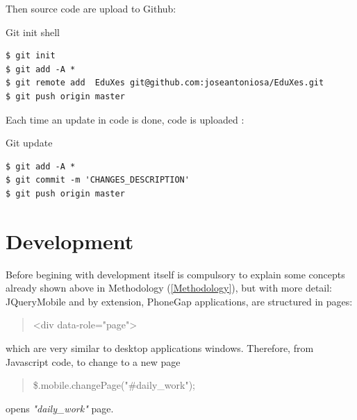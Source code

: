 Then source code are upload to Github: 

  \begin{bclogo}[couleur=green!30,arrondi=0.1, logo=\bcpanchant,  ombre=true ] 
{Git init shell}   
\begin{verbatim}
$ git init
$ git add -A *
$ git remote add  EduXes git@github.com:joseantoniosa/EduXes.git 
$ git push origin master
\end{verbatim}
\end{bclogo}

Each time an update in code is done,  code is uploaded :

  \begin{bclogo}[couleur=green!30,arrondi=0.1, logo=\bcpanchant,  ombre=true ] 
{Git update}   
\begin{verbatim}
$ git add -A *
$ git commit -m 'CHANGES_DESCRIPTION'
$ git push origin master
\end{verbatim}
\end{bclogo}

\newpage
\section{Development}
 Before begining with development itself is compulsory to explain some concepts already shown above in Methodology (\ref{Methodology}), but with more detail:
JQueryMobile \cite{JQueryMobile} and by extension,  PhoneGap \cite{PhoneGap}  applications, are structured in pages:
 \begin{quote}
  <div data-role="page">
 \end{quote}

   which are very similar to desktop applications windows. Therefore, from Javascript code, to change to a new page 
\begin{quote}
 \$.mobile.changePage("\#daily\_work");
\end{quote}
       opens \textit{"daily\_work"} page.  
     
